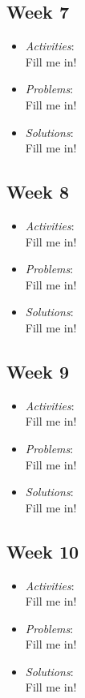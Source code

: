 \documentclass[compsoc,draftclsnofoot,onecolumn,10pt]{IEEEtran}
\begin{document}
\subsection{Week 7}
	\begin{itemize}
        \item \textit{Activities}:\\
        Fill me in!
        \item \textit{Problems}:\\
        Fill me in!
        \item \textit{Solutions}:\\
        Fill me in!
	\end{itemize}
   
\subsection{Week 8}
	\begin{itemize}
        \item \textit{Activities}:\\
        Fill me in!
        \item \textit{Problems}:\\
        Fill me in!
        \item \textit{Solutions}:\\
        Fill me in!
	\end{itemize}
   
\subsection{Week 9}
	\begin{itemize}
        \item \textit{Activities}:\\
        Fill me in!
        \item \textit{Problems}:\\
        Fill me in!
        \item \textit{Solutions}:\\
        Fill me in!
	\end{itemize}
   
\subsection{Week 10}
	\begin{itemize}
        \item \textit{Activities}:\\
        Fill me in!
        \item \textit{Problems}:\\
        Fill me in!
        \item \textit{Solutions}:\\
        Fill me in!
	\end{itemize}
   
\end{document}
